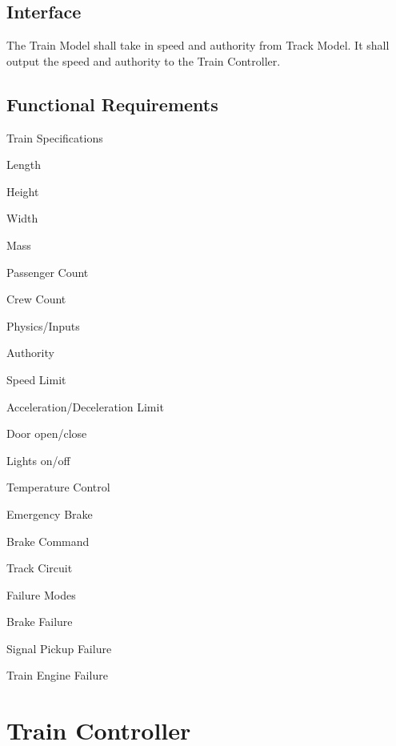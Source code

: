 \documentclass{scrreprt}
\begin{document}
\subsection{Interface}
The Train Model shall take in speed and authority from Track Model. It shall
output the speed and authority to the Train Controller.

\subsection{Functional Requirements}
\begin{numonly}
  \item Train Specifications
   \begin{numonly}
    \item Length
    \item Height
    \item Width
    \item Mass
    \item Passenger Count
    \item Crew Count
   \end{numonly}
  \item Physics/Inputs
  \begin{numonly}
   \item Authority
   \item Speed Limit
   \item Acceleration/Deceleration Limit
   \item Door open/close
   \item Lights on/off
   \item Temperature Control
   \item Emergency Brake
   \item Brake Command
   \item Track Circuit
  \end{numonly}
  \item Failure Modes
    \begin{numonly}
     \item Brake Failure
     \item Signal Pickup Failure
     \item Train Engine Failure
    \end{numonly}
\end{numonly}


\section{Train Controller}
\end{document}
